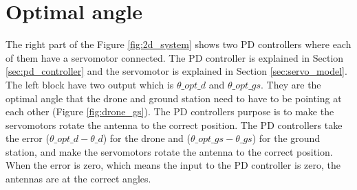 \section{Optimal angle}\label{sec:opt_angle}

The right part of the Figure \ref{fig:2d_system} shows two PD controllers where each of them have a servomotor connected. The PD controller is explained in Section \ref{sec:pd_controller} and the servomotor is explained in Section \ref{sec:servo_model}. The left block have two output which is $\theta\_opt\_d$ and $\theta\_opt\_gs$. They are the optimal angle that the drone and ground station need to have to be pointing at each other (Figure \ref{fig:drone_gs}). The PD controllers purpose is to make the servomotors rotate the antenna to the correct position. The PD controllers take the error ($\theta\_opt\_d - \theta\_d$) for the drone and ($\theta\_opt\_gs - \theta\_gs$) for the ground station, and make the servomotors rotate the antenna to the correct position. When the error is zero, which means the input to the PD controller is zero, the antennas are at the correct angles.